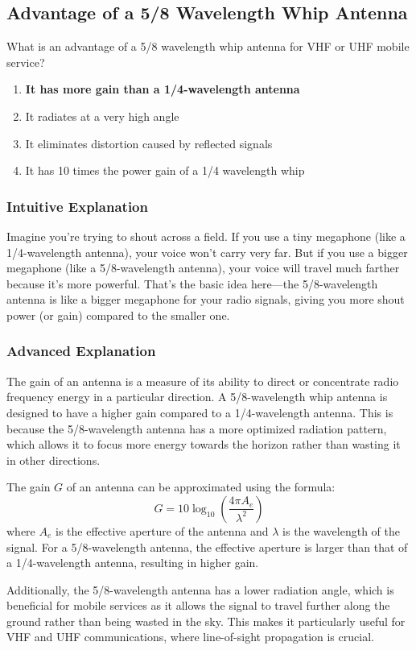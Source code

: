 \subsection{Advantage of a 5/8 Wavelength Whip Antenna}
\label{T9A12}

\begin{tcolorbox}[colback=gray!10!white,colframe=black!75!black,title=T9A12]
What is an advantage of a 5/8 wavelength whip antenna for VHF or UHF mobile service?
\begin{enumerate}[label=\Alph*)]
    \item \textbf{It has more gain than a 1/4-wavelength antenna}
    \item It radiates at a very high angle
    \item It eliminates distortion caused by reflected signals
    \item It has 10 times the power gain of a 1/4 wavelength whip
\end{enumerate}
\end{tcolorbox}

\subsubsection{Intuitive Explanation}
Imagine you're trying to shout across a field. If you use a tiny megaphone (like a 1/4-wavelength antenna), your voice won't carry very far. But if you use a bigger megaphone (like a 5/8-wavelength antenna), your voice will travel much farther because it’s more powerful. That’s the basic idea here—the 5/8-wavelength antenna is like a bigger megaphone for your radio signals, giving you more shout power (or gain) compared to the smaller one.

\subsubsection{Advanced Explanation}
The gain of an antenna is a measure of its ability to direct or concentrate radio frequency energy in a particular direction. A 5/8-wavelength whip antenna is designed to have a higher gain compared to a 1/4-wavelength antenna. This is because the 5/8-wavelength antenna has a more optimized radiation pattern, which allows it to focus more energy towards the horizon rather than wasting it in other directions.

The gain \( G \) of an antenna can be approximated using the formula:
\[
G = 10 \log_{10} \left( \frac{4 \pi A_e}{\lambda^2} \right)
\]
where \( A_e \) is the effective aperture of the antenna and \( \lambda \) is the wavelength of the signal. For a 5/8-wavelength antenna, the effective aperture is larger than that of a 1/4-wavelength antenna, resulting in higher gain.

Additionally, the 5/8-wavelength antenna has a lower radiation angle, which is beneficial for mobile services as it allows the signal to travel further along the ground rather than being wasted in the sky. This makes it particularly useful for VHF and UHF communications, where line-of-sight propagation is crucial.

